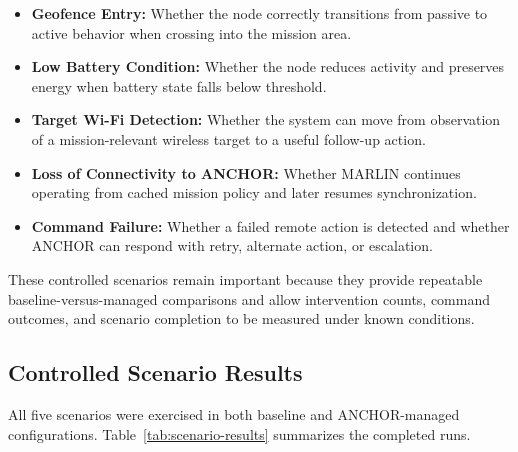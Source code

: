 \documentclass[journal]{IEEEtran}
\begin{document}
\begin{itemize}
    \item \textbf{Geofence Entry:} Whether the node correctly transitions from passive to active behavior when crossing into the mission area.
    \item \textbf{Low Battery Condition:} Whether the node reduces activity and preserves energy when battery state falls below threshold.
    \item \textbf{Target Wi-Fi Detection:} Whether the system can move from observation of a mission-relevant wireless target to a useful follow-up action.
    \item \textbf{Loss of Connectivity to ANCHOR:} Whether MARLIN continues operating from cached mission policy and later resumes synchronization.
    \item \textbf{Command Failure:} Whether a failed remote action is detected and whether ANCHOR can respond with retry, alternate action, or escalation.
\end{itemize}

These controlled scenarios remain important because they provide repeatable baseline-versus-managed comparisons and allow intervention counts, command outcomes, and scenario completion to be measured under known conditions.

\subsection{Controlled Scenario Results}
All five scenarios were exercised in both baseline and ANCHOR-managed configurations. Table~\ref{tab:scenario-results} summarizes the completed runs.
\end{document}
